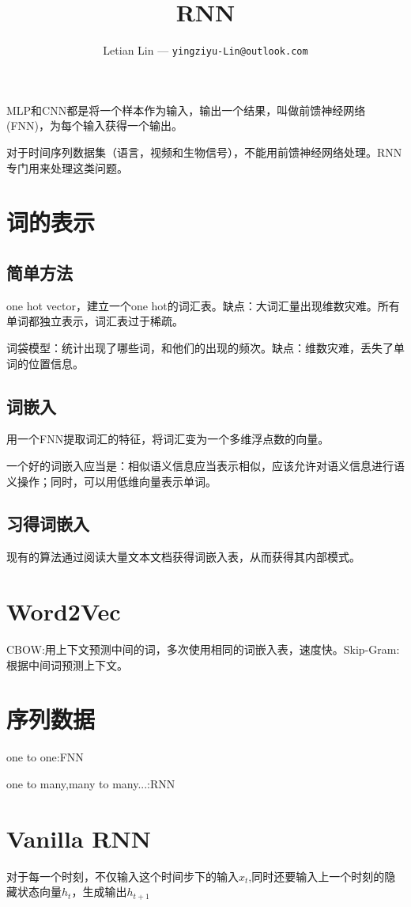 \documentclass[UTF8]{ctexart}
\title{
  RNN
}
\author{
	Letian Lin --- \texttt{yingziyu-Lin@outlook.com}
}
\begin{document}
\maketitle

MLP和CNN都是将一个样本作为输入，输出一个结果，叫做前馈神经网络(FNN)，为每个输入获得一个输出。

对于时间序列数据集（语言，视频和生物信号），不能用前馈神经网络处理。RNN专门用来处理这类问题。

\section{词的表示}
\subsection{简单方法}
one hot vector，建立一个one hot的词汇表。缺点：大词汇量出现维数灾难。所有单词都独立表示，词汇表过于稀疏。

词袋模型：统计出现了哪些词，和他们的出现的频次。缺点：维数灾难，丢失了单词的位置信息。

\subsection{词嵌入}
用一个FNN提取词汇的特征，将词汇变为一个多维浮点数的向量。

一个好的词嵌入应当是：相似语义信息应当表示相似，应该允许对语义信息进行语义操作；同时，可以用低维向量表示单词。

\subsection{习得词嵌入}
现有的算法通过阅读大量文本文档获得词嵌入表，从而获得其内部模式。

\section{Word2Vec}
CBOW:用上下文预测中间的词，多次使用相同的词嵌入表，速度快。Skip-Gram:根据中间词预测上下文。

\section{序列数据}
one to one:FNN

one to many,many to many...:RNN

\section{Vanilla RNN}
对于每一个时刻，不仅输入这个时间步下的输入$x_t$,同时还要输入上一个时刻的隐藏状态向量$h_t$，生成输出$h_{t+1}$
\end{document}
